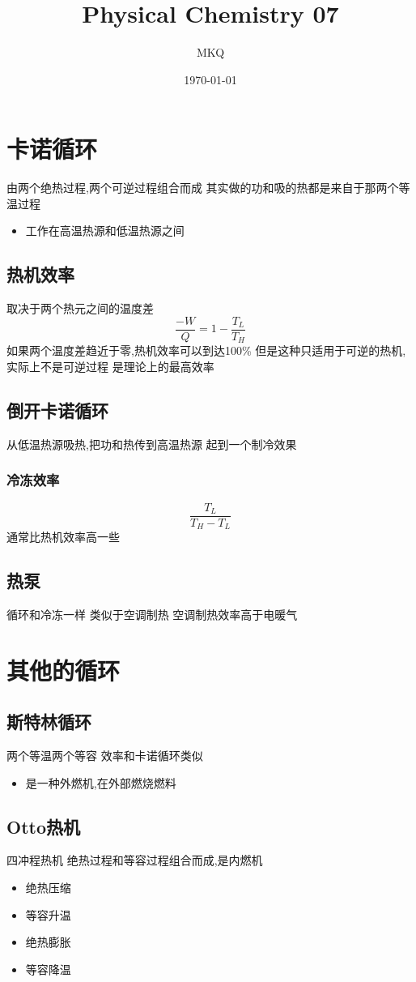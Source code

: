 \documentclass[11pt]{article}
\author{MKQ}
\date{\today}
\title{Physical Chemistry 07}
\begin{document}
\maketitle
\tableofcontents

\section{卡诺循环}
\label{sec:org773f4df}
由两个绝热过程,两个可逆过程组合而成
其实做的功和吸的热都是来自于那两个等温过程
\begin{itemize}
\item 工作在高温热源和低温热源之间
\end{itemize}
\subsection{热机效率}
\label{sec:org552daa8}
取决于两个热元之间的温度差
\[
\frac{-W}{Q}=1-\frac{T_L}{T_H}
\]
如果两个温度差趋近于零,热机效率可以到达100\%
但是这种只适用于可逆的热机,实际上不是可逆过程
是理论上的最高效率
\subsection{倒开卡诺循环}
\label{sec:org96c35cf}
从低温热源吸热,把功和热传到高温热源
起到一个制冷效果
\subsubsection{冷冻效率}
\label{sec:org41cff06}
\[
\frac{T_L}{T_H-T_L}
\]
通常比热机效率高一些
\subsection{热泵}
\label{sec:org725d9b9}
循环和冷冻一样
类似于空调制热
空调制热效率高于电暖气
\section{其他的循环}
\label{sec:org45c0ccb}
\subsection{斯特林循环}
\label{sec:org0504b0a}
两个等温两个等容
效率和卡诺循环类似
\begin{itemize}
\item 是一种外燃机,在外部燃烧燃料
\end{itemize}
\subsection{Otto热机}
\label{sec:org85a51ac}
四冲程热机
绝热过程和等容过程组合而成,是内燃机
\begin{itemize}
\item 绝热压缩
\item 等容升温
\item 绝热膨胀
\item 等容降温
\end{itemize}
\end{document}
